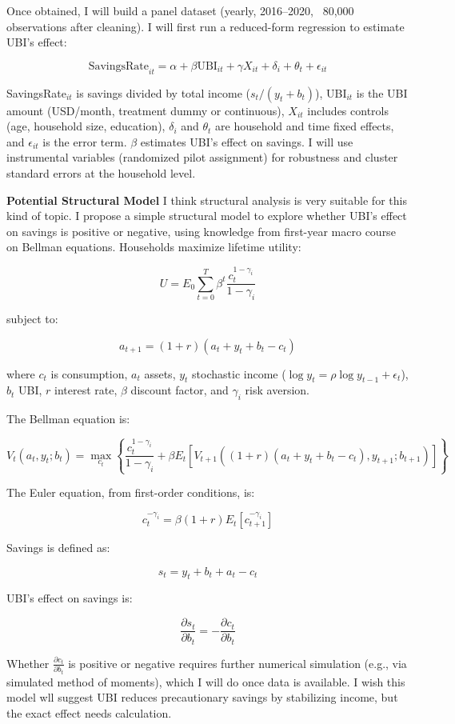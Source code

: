 \documentclass[12pt]{article}
\begin{document}
Once obtained, I will build a panel dataset (yearly, 2016–2020, ~80,000 observations after cleaning). I will first run a reduced-form regression to estimate UBI’s effect:

\[
\text{SavingsRate}_{it} = \alpha + \beta \text{UBI}_{it} + \gamma X_{it} + \delta_i + \theta_t + \epsilon_{it}
\]

SavingsRate\(_{it}\) is savings divided by total income (\( s_t / (y_t + b_t) \)), UBI\(_{it}\) is the UBI amount (USD/month, treatment dummy or continuous), \( X_{it} \) includes controls (age, household size, education), \( \delta_i \) and \( \theta_t \) are household and time fixed effects, and \( \epsilon_{it} \) is the error term. \(\beta\) estimates UBI’s effect on savings. I will use instrumental variables (randomized pilot assignment) for robustness and cluster standard errors at the household level.

\textbf{Potential Structural Model}
I think structural analysis is very suitable for this kind of topic. I propose a simple structural model to explore whether UBI’s effect on savings is positive or negative, using knowledge from first-year macro course on Bellman equations. Households maximize lifetime utility:

\[
U = {E}_0 \sum_{t=0}^T \beta^t \frac{c_t^{1 - \gamma_i}}{1 - \gamma_i}
\]

subject to:

\[
a_{t+1} = (1 + r)(a_t + y_t + b_t - c_t)
\]

where \( c_t \) is consumption, \( a_t \) assets, \( y_t \) stochastic income (\(\log y_t = \rho \log y_{t-1} + \epsilon_t\)), \( b_t \) UBI, \( r \) interest rate, \( \beta \) discount factor, and \( \gamma_i \) risk aversion.

The Bellman equation is:

\[
V_t(a_t, y_t; b_t) = \max_{c_t} \left\{ \frac{c_t^{1 - \gamma_i}}{1 - \gamma_i} + \beta {E}_t \left[ V_{t+1} \left( (1 + r)(a_t + y_t + b_t - c_t), y_{t+1}; b_{t+1} \right) \right] \right\}
\]

The Euler equation, from first-order conditions, is:

\[
c_t^{-\gamma_i} = \beta (1 + r){E}_t \left[ c_{t+1}^{-\gamma_i} \right]
\]

Savings is defined as:

\[
s_t = y_t + b_t + a_t - c_t
\]

UBI’s effect on savings is:

\[
\frac{\partial s_t}{\partial b_t} = - \frac{\partial c_t}{\partial b_t}
\]

Whether \(\frac{\partial c_t}{\partial b_t}\) is positive or negative requires further numerical simulation (e.g., via simulated method of moments), which I will do once data is available. I wish this model wll suggest UBI reduces precautionary savings by stabilizing income, but the exact effect needs calculation.



\end{document}

